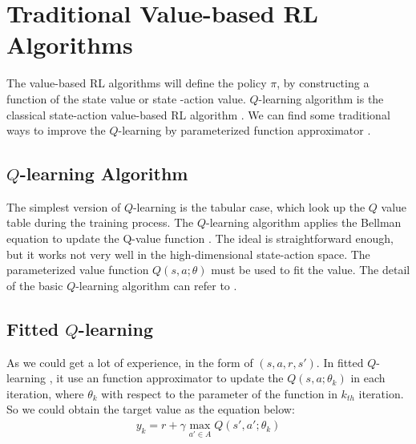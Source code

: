 \documentclass{article}
\begin{document}
%
\section{Traditional Value-based RL Algorithms}
\label{sec:Traditional Value-based RL Algorithms}
The value-based RL algorithms will define the policy $\pi$, by constructing a function of the state value or state -action value.  $Q$-learning algorithm \citep{watkins1992q} is the classical state-action value-based RL algorithm . We can find some traditional ways to improve the $Q$-learning by parameterized function approximator \citep{gordon1996stable}.



\subsection{$Q$-learning Algorithm}
The simplest version of $Q$-learning is the tabular case, which look up the $Q$ value table during the training process.  The  $Q$-learning algorithm applies the Bellman equation to update the Q-value function \citep{bellman1962dynamic}. The ideal is straightforward enough, but it works not very well in the high-dimensional state-action space. The parameterized value function  $Q(s, a; \theta)$ must be used to fit the value. The detail of the basic $Q$-learning algorithm can refer to \citep{sutton2018reinforcement}.

\subsection{Fitted $Q$-learning}
As we could get a lot of experience, in the form of  $(s,a,r,s')$. In fitted $Q$-learning \citep{gordon1996stable}, it use an function approximator to update the  $Q(s, a; \theta_k )$ in each iteration, where  $\theta_k$ with respect to the parameter of  the function  in $k_{th}$ iteration. So we could obtain the target value as the equation below:
$$
\begin{aligned}
y_k = r +\gamma \operatorname*{max}_{a' \in  A} Q(s',a';\theta_{k})
\end{aligned}
$$
\end{document}
